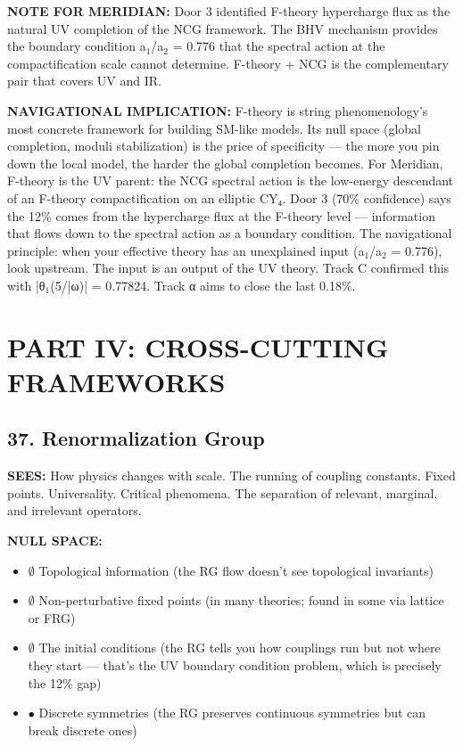 \textbf{NOTE FOR MERIDIAN:} Door 3 identified F-theory hypercharge flux as the natural UV completion of the NCG framework. The BHV mechanism provides the boundary condition a$_1$/\allowbreak a$_2$ = 0.776 that the spectral action at the compactification scale cannot determine. F-theory + NCG is the complementary pair that covers UV and IR.


\textbf{NAVIGATIONAL IMPLICATION:} F-theory is string phenomenology's most concrete framework for building SM-like models. Its null space (global completion, moduli stabilization) is the price of specificity — the more you pin down the local model, the harder the global completion becomes. For Meridian, F-theory is the UV parent: the NCG spectral action is the low-energy descendant of an F-theory compactification on an elliptic CY₄. Door 3 (70\% confidence) says the 12\% comes from the hypercharge flux at the F-theory level — information that flows down to the spectral action as a boundary condition. The navigational principle: when your effective theory has an unexplained input (a$_1$/\allowbreak a$_2$ = 0.776), look upstream. The input is an output of the UV theory. Track C confirmed this with |θ$_1$(5/|ω)| = 0.77824. Track α aims to close the last 0.18\%.


\bigskip\noindent\makebox[\textwidth]{\color{rulegray}\rule{5cm}{0.3pt}}\bigskip


\section*{PART IV: CROSS-CUTTING FRAMEWORKS}


\subsection*{37. Renormalization Group}


\textbf{SEES:} How physics changes with scale. The running of coupling constants. Fixed points. Universality. Critical phenomena. The separation of relevant, marginal, and irrelevant operators.


\textbf{NULL SPACE:}

\begin{itemize}[nosep,leftmargin=*]
  \item $\emptyset$ Topological information (the RG flow doesn't see topological invariants)
  \item $\emptyset$ Non-perturbative fixed points (in many theories; found in some via lattice or FRG)
  \item $\emptyset$ The initial conditions (the RG tells you how couplings run but not where they start — that's the UV boundary condition problem, which is precisely the 12\% gap)
  \item $\bullet$ Discrete symmetries (the RG preserves continuous symmetries but can break discrete ones)
\end{itemize}


